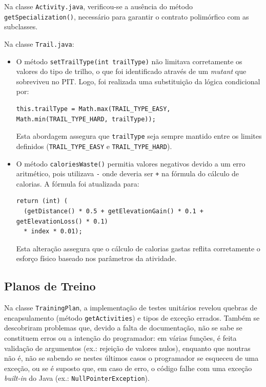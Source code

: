 \documentclass[12pt, a4paper]{article}
\begin{document}
Na classe \texttt{Activity.java}, verificou-se a ausência do método \texttt{getSpecialization()},
necessário para garantir o contrato polimórfico com as subclasses.

Na classe \texttt{Trail.java}:
\begin{itemize}
  \item O método \texttt{setTrailType(int trailType)} não limitava corretamente os valores do tipo
  de trilho, o que foi identificado através de um \emph{mutant} que sobreviveu no PIT. Logo, foi
  realizada uma substituição da lógica condicional por:
  \begin{lstlisting}
this.trailType = Math.max(TRAIL_TYPE_EASY, Math.min(TRAIL_TYPE_HARD, trailType));
  \end{lstlisting}
  Esta abordagem assegura que \texttt{trailType} seja sempre mantido entre os limites definidos
  (\texttt{TRAIL\_TYPE\_EASY} e \texttt{TRAIL\_TYPE\_HARD}).

  \item O método \texttt{caloriesWaste()} permitia valores negativos devido a um erro aritmético,
  pois utilizava \texttt{-} onde deveria ser \texttt{+} na fórmula do cálculo de calorias. A fórmula
  foi atualizada para:
  \begin{lstlisting}
return (int) (
  (getDistance() * 0.5 + getElevationGain() * 0.1 + getElevationLoss() * 0.1)
  * index * 0.01);
  \end{lstlisting}
  Esta alteração assegura que o cálculo de calorias gastas reflita corretamente o esforço físico
  baseado nos parâmetros da atividade.
\end{itemize}

\subsection{Planos de Treino}

Na classe \texttt{TrainingPlan}, a implementação de testes unitários revelou quebras de
encapsulamento (método \texttt{getActivities}) e tipos de exceção errados. Também se descobriram
problemas que, devido a falta de documentação, não se sabe se constituem erros ou a intenção do
programador: em várias funções, é feita validação de argumentos (ex.: rejeição de valores nulos),
enquanto que noutras não é, não se sabendo se nestes últimos casos o programador se esqueceu de
uma exceção, ou se é suposto que, em caso de erro, o código falhe com uma exceção \emph{built-in} do
Java (ex.: \texttt{NullPointerException}).
\end{document}

